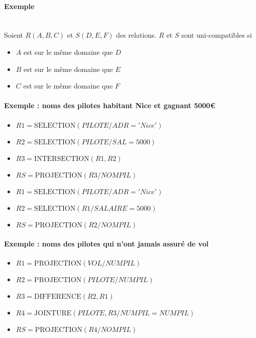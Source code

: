 \documentclass[10pt]{article}
\begin{document}
            \paragraph{Exemple}~\\
                Soient $R(A,B,C)$ et $S(D,E,F)$ des relations. $R$ et $S$ sont uni-compatibles si
                \begin{itemize}
                    \item $A$ est sur le même domaine que $D$
                    \item $B$ est sur le même domaine que $E$
                    \item $C$ est sur le même domaine que $F$
                \end{itemize}

            \paragraph{Exemple : noms des pilotes habitant Nice et gagnant 5000\euro}
                \begin{itemize}
                    \renewcommand{\labelitemi}{ } %
                    \item $R1=\mathrm{SELECTION}(PILOTE/ADR='Nice')$
                    \item $R2=\mathrm{SELECTION}(PILOTE/SAL=5000)$
                    \item $R3=\mathrm{INTERSECTION}(R1,R2)$
                    \item $RS=\mathrm{PROJECTION}(R3/NOMPIL)$
                \end{itemize}
                \vskip15pt
                \begin{itemize}
                    \renewcommand{\labelitemi}{ } %
                    \item $R1=\mathrm{SELECTION}(PILOTE/ADR='Nice')$
                    \item $R2=\mathrm{SELECTION}(R1/SALAIRE=5000)$
                    \item $RS=\mathrm{PROJECTION}(R2/NOMPIL)$
                \end{itemize}

            \paragraph{Exemple : noms des pilotes qui n'ont jamais assuré de vol}
                \begin{itemize}
                    \renewcommand{\labelitemi}{ } %
                    \item $R1=\mathrm{PROJECTION}(VOL/NUMPIL)$
                    \item $R2=\mathrm{PROJECTION}(PILOTE/NUMPIL)$
                    \item $R3=\mathrm{DIFFERENCE}(R2,R1)$
                    \item $R4=\mathrm{JOINTURE}(PILOTE,R3/NUMPIL=NUMPIL)$
                    \item $RS=\mathrm{PROJECTION}(R4/NOMPIL)$
                \end{itemize}
\end{document}

